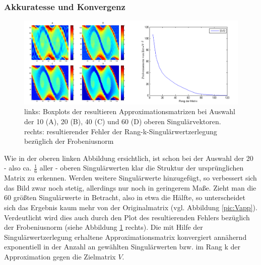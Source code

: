 \documentclass[12pt,a4paper,twoside]{article}
\begin{document}
\subsubsection*{Akkuratesse und Konvergenz}
\begin{figure}[h]
	
	\centering
	\includegraphics[scale=0.45]{SVD_plots_graph}
	\caption{\label{pic:SVD_plots}links: Boxplots der resultieren Approximationsmatrizen bei Auswahl der 10 (A), 20 (B), 40 (C) und 60 (D) oberen Singulärvektoren. rechts: resultierender Fehler der Rang-k-Singulärwertzerlegung bezüglich der Frobeniusnorm}
\end{figure}
Wie in der oberen linken Abbildung ersichtlich, ist schon bei der Auswahl der 20 - also ca. $\frac{1}{6}$ aller - oberen Singulärwerten klar die Struktur der ursprünglichen Matrix zu erkennen. Werden weitere Singulärwerte hinzugefügt, so verbessert sich das Bild zwar noch stetig, allerdings nur noch in geringerem Maße. Zieht man die 60 größten Singulärwerte in Betracht, also in etwa die Hälfte, so unterscheidet sich das Ergebnis kaum mehr von der Originalmatrix (vgl. Abbildung \ref{pic:Vapp}). \newline
\newline
Verdeutlicht wird dies auch durch den Plot des resultierenden Fehlers bezüglich der Frobeniusnorm (siehe Abbildung \ref{pic:SVD_plots} rechts). Die mit Hilfe der Singulärwertzerlegung erhaltene Approximationsmatrix konvergiert annähernd exponentiell in der Anzahl an gewählten Singulärwerten bzw. im Rang k der Approximation gegen die Zielmatrix $V$.
\end{document}
